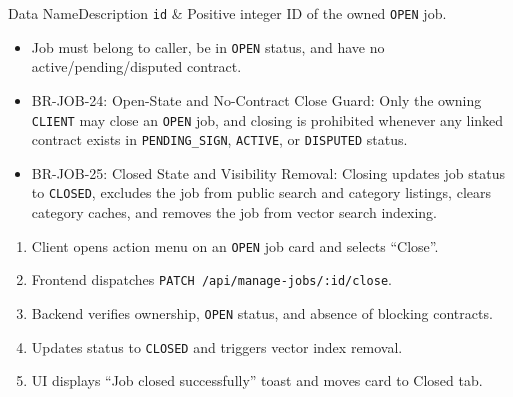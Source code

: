 \begin{specdatatable}{Data Name}{Description}
\texttt{id} & Positive integer ID of the owned \texttt{OPEN} job.\\ \hline
\end{specdatatable}

\begin{itemize}[leftmargin=1.6em,topsep=3pt,itemsep=2pt,parsep=0pt,label=$\bullet$]
    \item Job must belong to caller, be in \texttt{OPEN} status, and have no active/pending/disputed contract.
\end{itemize}

\begin{itemize}[leftmargin=1.6em,topsep=3pt,itemsep=2pt,parsep=0pt,label=$\bullet$]\brrulelist
    \item BR-JOB-24: Open-State and No-Contract Close Guard: Only the owning \texttt{CLIENT} may close an \texttt{OPEN} job, and closing is prohibited whenever any linked contract exists in \texttt{PENDING\_SIGN}, \texttt{ACTIVE}, or \texttt{DISPUTED} status.
    \item BR-JOB-25: Closed State and Visibility Removal: Closing updates job status to \texttt{CLOSED}, excludes the job from public search and category listings, clears category caches, and removes the job from vector search indexing.
\end{itemize}

\begin{enumerate}[leftmargin=1.8em,topsep=3pt,itemsep=2pt,parsep=0pt]
    \item Client opens action menu on an \texttt{OPEN} job card and selects ``Close''.
    \item Frontend dispatches \texttt{PATCH /api/manage-jobs/:id/close}.
    \item Backend verifies ownership, \texttt{OPEN} status, and absence of blocking contracts.
    \item Updates status to \texttt{CLOSED} and triggers vector index removal.
    \item UI displays ``Job closed successfully'' toast and moves card to Closed tab.
\end{enumerate}

